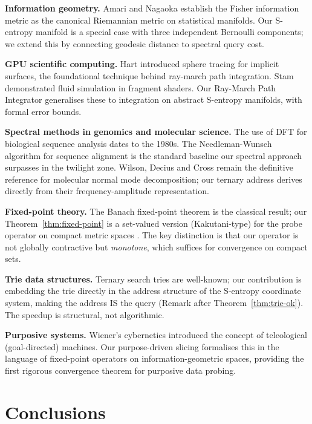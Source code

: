 \documentclass[10pt,twocolumn]{article}
\begin{document}
\textbf{Information geometry.}
Amari and Nagaoka \cite{amari1998} establish the Fisher information metric
as the canonical Riemannian metric on statistical manifolds.
Our S-entropy manifold is a special case with three independent Bernoulli components;
we extend this by connecting geodesic distance to spectral query cost.

\textbf{GPU scientific computing.}
Hart \cite{hart1996} introduced sphere tracing for implicit surfaces,
the foundational technique behind ray-march path integration.
Stam \cite{stam1999} demonstrated fluid simulation in fragment shaders.
Our Ray-March Path Integrator generalises these to integration on abstract
S-entropy manifolds, with formal error bounds.

\textbf{Spectral methods in genomics and molecular science.}
The use of DFT for biological sequence analysis dates to the 1980s.
The Needleman-Wunsch algorithm \cite{needleman1970} for sequence alignment
is the standard baseline our spectral approach surpasses in the twilight zone.
Wilson, Decius and Cross \cite{wilson1955} remain the definitive reference
for molecular normal mode decomposition; our ternary address derives
directly from their frequency-amplitude representation.

\textbf{Fixed-point theory.}
The Banach fixed-point theorem \cite{banach1922} is the classical result;
our Theorem~\ref{thm:fixed-point} is a set-valued version (Kakutani-type)
for the probe operator on compact metric spaces \cite{dunford1988}.
The key distinction is that our operator is not globally contractive
but \emph{monotone}, which suffices for convergence on compact sets.

\textbf{Trie data structures.}
Ternary search tries \cite{knuth1997} are well-known; our contribution
is embedding the trie directly in the address structure of the S-entropy
coordinate system, making the address IS the query (Remark after
Theorem~\ref{thm:trie-ok}). The speedup is structural, not algorithmic.

\textbf{Purposive systems.}
Wiener's cybernetics \cite{wiener1948} introduced the concept of teleological
(goal-directed) machines. Our purpose-driven slicing formalises this
in the language of fixed-point operators on information-geometric spaces,
providing the first rigorous convergence theorem for purposive data probing.

\section{Conclusions}
\label{sec:conclusions}
\end{document}

